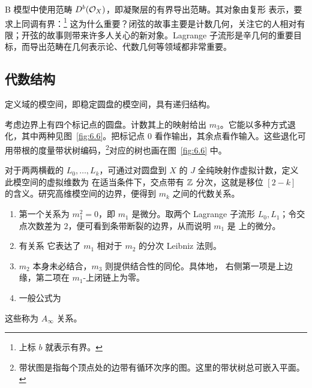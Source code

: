 B 模型中使用范畴 $D^b(\mathcal O_X)$，即凝聚层的有界导出范畴。其对象由复形
表示，要求上同调有界：\footnote{上标 $b$ 就表示有界。}
这为什么重要？闭弦的故事主要是计数几何，关注它的人相对有限；开弦的故事则带来许多人关心的新对象。Lagrange 子流形是辛几何的重要目标，而导出范畴在几何表示论、代数几何等领域都非常重要。
\subsection{代数结构}
定义域的模空间，即稳定圆盘的模空间，具有递归结构。
\begin{example}\label{ex:6.1}
考虑边界上有四个标记点的圆盘。计数其上的映射给出 $m_3$。它能以多种方式退化，其中两种见图~\ref{fig:6.6}。把标记点 $0$ 看作输出，其余点看作输入。这些退化可用带根的度量带状树编码，\footnote{带状图是指每个顶点处的边带有循环次序的图。这里的带状树总可嵌入平面。}对应的树也画在图~\ref{fig:6.6} 中。
\end{example}
对于两两横截的 $L_0,\ldots,L_k$，可通过对圆盘到 $X$ 的 $J$ 全纯映射作虚拟计数，定义
此模空间的虚拟维数为
在适当条件下，交点带有 $\mathbb Z$ 分次，这就是移位 $[2-k]$ 的含义。研究高维模空间的边界，便得到 $m_k$ 之间的代数关系。
\begin{example}\label{ex:6.2}
\begin{enumerate}[label=(\alph*)]
\item 第一个关系为 $m_1^2=0$，即 $m_1$ 是微分。取两个 Lagrange 子流形 $L_0,L_1$；令交点次数差为 $2$，便可看到条带断裂的边界，从而说明 $m_1$ 是
上的微分。
\item 有关系
它表达了 $m_1$ 相对于 $m_2$ 的分次 Leibniz 法则。
\item $m_2$ 本身未必结合，$m_3$ 则提供结合性的同伦。具体地，
右侧第一项是上边缘，第二项在 $m_1$-上闭链上为零。
\item 一般公式为
\end{enumerate}
这些称为 $A_\infty$ 关系。
\end{example}
